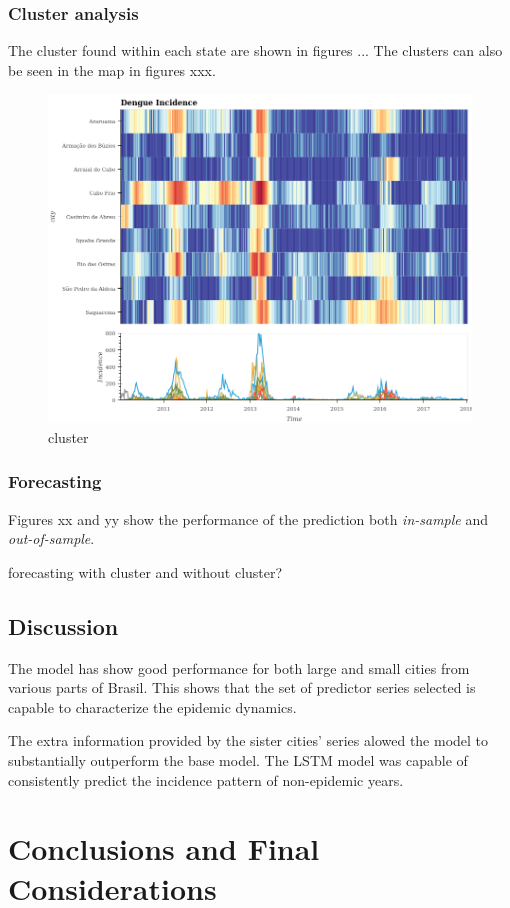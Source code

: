 \documentclass[12pt]{report}
\begin{document}
\subsection{Cluster analysis}
The cluster found within each state are shown in figures ... The clusters can 
also be seen in the map in figures xxx.
\begin{figure}[h]
 \centering
 \includegraphics[scale=0.4]{./cluster_3300209.png}
 \caption{cluster}
\end{figure}

\subsection{Forecasting}

Figures xx and yy show the performance of the prediction  both \emph{in-sample} 
and  \emph{out-of-sample}.

forecasting with cluster and without cluster?

\section{Discussion}

The model has show good performance for both large and small cities from various parts of Brasil. This shows that the set of predictor series selected is capable to characterize the epidemic dynamics.

The extra information provided by the sister cities' series alowed the model to substantially outperform the base model. The LSTM model was capable of consistently predict the incidence pattern of non-epidemic years. 

\newpage
\chapter{Conclusions and Final Considerations}

\newpage
{}
{}



\newpage
{}
{}
\end{document}
